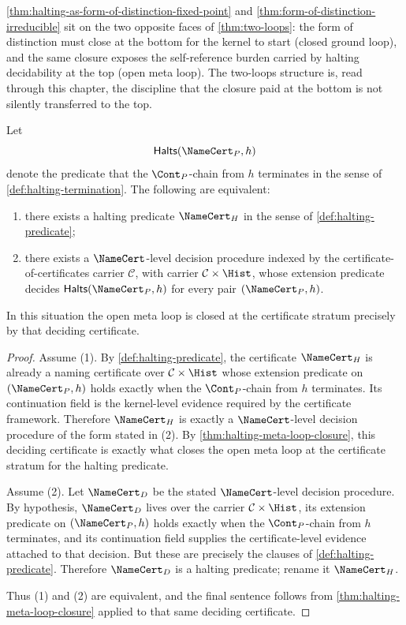 \begin{remark}
\label{rem:halting-two-loops}
\autoref{thm:halting-as-form-of-distinction-fixed-point} and \autoref{thm:form-of-distinction-irreducible} sit on the two opposite faces of \autoref{thm:two-loops}: the form of distinction must close at the bottom for the kernel to start (closed ground loop), and the same closure exposes the self-reference burden carried by halting decidability at the top (open meta loop). The two-loops structure is, read through this chapter, the discipline that the closure paid at the bottom is not silently transferred to the top.
\end{remark}

\begin{theorem}
\label{thm:halting-predicate-iff-meta-loop-certificate-stratum}
Let
$$
\mathsf{Halts}(\NameCert_P,h)
$$
denote the predicate that the $\Cont_P$-chain from $h$ terminates in the sense of \autoref{def:halting-termination}. The following are equivalent:
\begin{enumerate}
\item there exists a halting predicate $\NameCert_H$ in the sense of \autoref{def:halting-predicate};
\item there exists a $\NameCert$-level decision procedure indexed by the certificate-of-certificates carrier $\mathcal{C}$, with carrier $\mathcal{C}\times\Hist$, whose extension predicate decides $\mathsf{Halts}(\NameCert_P,h)$ for every pair $(\NameCert_P,h)$.
\end{enumerate}
In this situation the open meta loop is closed at the certificate stratum precisely by that deciding certificate.
\end{theorem}

\begin{proof}
Assume (1). By \autoref{def:halting-predicate}, the certificate $\NameCert_H$ is already a naming certificate over $\mathcal{C}\times\Hist$ whose extension predicate on $(\NameCert_P,h)$ holds exactly when the $\Cont_P$-chain from $h$ terminates. Its continuation field is the kernel-level evidence required by the certificate framework. Therefore $\NameCert_H$ is exactly a $\NameCert$-level decision procedure of the form stated in (2). By \autoref{thm:halting-meta-loop-closure}, this deciding certificate is exactly what closes the open meta loop at the certificate stratum for the halting predicate.

Assume (2). Let $\NameCert_D$ be the stated $\NameCert$-level decision procedure. By hypothesis, $\NameCert_D$ lives over the carrier $\mathcal{C}\times\Hist$, its extension predicate on $(\NameCert_P,h)$ holds exactly when the $\Cont_P$-chain from $h$ terminates, and its continuation field supplies the certificate-level evidence attached to that decision. But these are precisely the clauses of \autoref{def:halting-predicate}. Therefore $\NameCert_D$ is a halting predicate; rename it $\NameCert_H$.

Thus (1) and (2) are equivalent, and the final sentence follows from \autoref{thm:halting-meta-loop-closure} applied to that same deciding certificate.
\end{proof}
